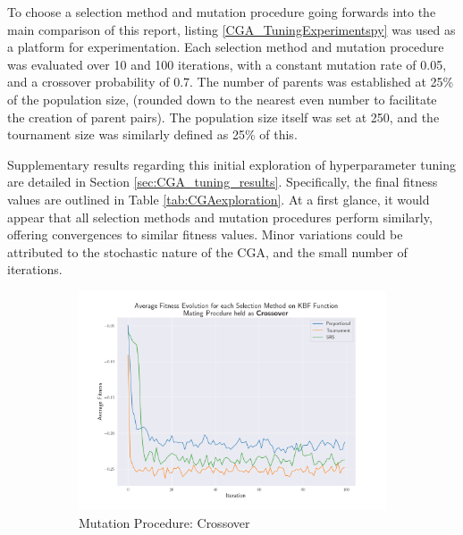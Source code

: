 \documentclass[10pt]{article}
\begin{document}
\begin{multicols}{2}
To choose a selection method and mutation procedure going forwards into the main comparison of this report, listing \ref{CGA_TuningExperimentspy} was used as a platform for experimentation. Each selection method and mutation procedure was evaluated over 10 and 100 iterations, with a constant mutation rate of 0.05, and a crossover probability of 0.7. The number of parents was established at 25\% of the population size, (rounded down to the nearest even number to facilitate the creation of parent pairs). The population size itself was set at 250, and the tournament size was similarly defined as 25\% of this.

Supplementary results regarding this initial exploration of hyperparameter tuning are detailed in Section \ref{sec:CGA_tuning_results}. Specifically, the final fitness values are outlined in Table \ref{tab:CGAexploration}. At a first glance, it would appear that all selection methods and mutation procedures perform similarly, offering convergences to similar fitness values. Minor variations could be attributed to the stochastic nature of the CGA, and the small number of iterations.
\vspace{-1mm}
\begin{figure}[H]
    \centering
    \begin{subfigure}{0.46\textwidth}
        \includegraphics[width=\textwidth]{../figures/Permanent Images/Fitness_Evolution_Crossover.png}
        \caption{Mutation Procedure: Crossover}
        \label{fig:CGA_fitness_evo_Crossover}
    \end{subfigure}
    \begin{subfigure}{0.46\textwidth}

\end{subfigure}
\end{figure}
\end{multicols}
\end{document}

